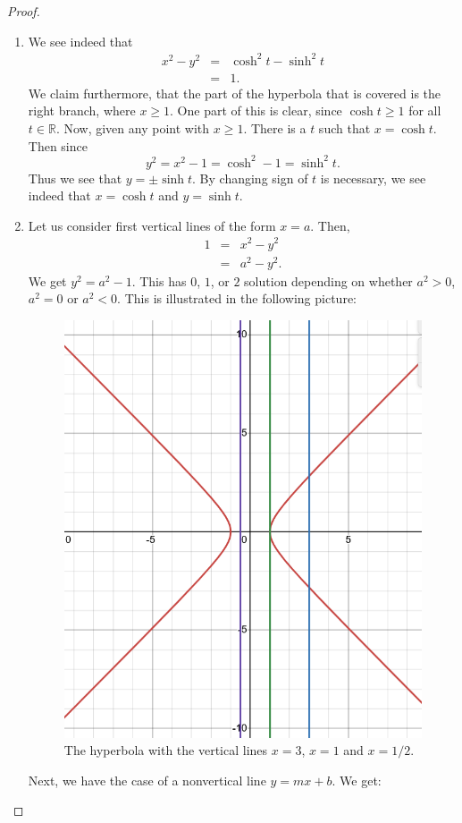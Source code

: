 \begin{proof}
    \begin{enumerate}
        \item We see indeed that
        \begin{eqnarray*}
            x^2 - y^2
            & = & \cosh^2 t - \sinh^2 t\\
            & = & 1.
        \end{eqnarray*}
        We claim furthermore, that the part of the hyperbola that is covered is the right branch, where $x\geq 1$. One part of this is clear, since $\cosh t\geq 1$ for all $t\in \mathbb{R}$. Now, given any point with $x\geq 1$. There is a $t$ such that $x=\cosh t$. Then since
        $$y^2 = x^2 - 1 = \cosh^2 - 1 = \sinh^2 t.$$
        Thus we see that $y = \pm \sinh t$. By changing sign of $t$ is necessary, we see indeed that $x=\cosh t$ and $y = \sinh t$.
        \item Let us consider first vertical lines of the form $x=a$. Then,
        \begin{eqnarray*}
            1
            & = & x^2 - y^2\\
            & = & a^2 - y^2.
        \end{eqnarray*}
        We get $y^2 = a^2 - 1$. This has $0$, $1$, or $2$ solution depending on whether $a^2 > 0$, $a^2 = 0$ or $a^2 < 0$. This is illustrated in the following picture:
        \begin{figure}[H]
            \centering
            \includegraphics[width=0.5\linewidth]{cox-little-oshea/assets/sec1-3-ex5b.png}
            \caption{The hyperbola with the vertical lines $x=3$, $x=1$ and $x=1/2$.}
            \label{fig:sec1-3-ex5b}
        \end{figure}
        Next, we have the case of a nonvertical line $y=mx+b$. We get:

\end{enumerate}
\end{proof}
